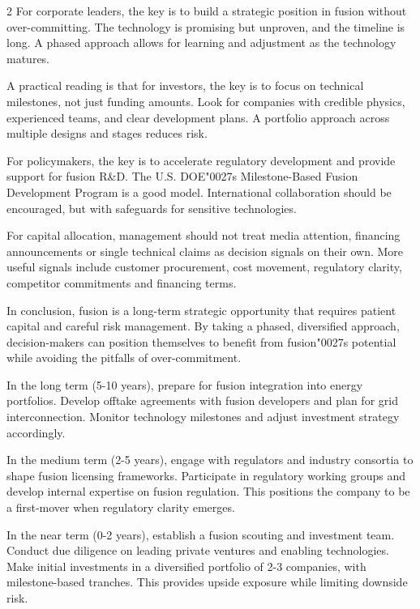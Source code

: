 \documentclass[10pt,a4paper]{article}
\newcommand{\BOApos}{{\BOQuoteFont\char"0027}}
\begin{document}
\begin{multicols}{2}
{\small For corporate leaders, the key is to build a strategic position in fusion without over-committing. The technology is promising but unproven, and the timeline is long. A phased approach allows for learning and adjustment as the technology matures.}\par
{\small A practical reading is that for investors, the key is to focus on technical milestones, not just funding amounts. Look for companies with credible physics, experienced teams, and clear development plans. A portfolio approach across multiple designs and stages reduces risk.}\par
{\small For policymakers, the key is to accelerate regulatory development and provide support for fusion R\&D. The U.S. DOE\BOApos{}s Milestone-Based Fusion Development Program is a good model. International collaboration should be encouraged, but with safeguards for sensitive technologies.}\par
{\small For capital allocation, management should not treat media attention, financing announcements or single technical claims as decision signals on their own. More useful signals include customer procurement, cost movement, regulatory clarity, competitor commitments and financing terms.}\par
{\small In conclusion, fusion is a long-term strategic opportunity that requires patient capital and careful risk management. By taking a phased, diversified approach, decision-makers can position themselves to benefit from fusion\BOApos{}s potential while avoiding the pitfalls of over-commitment.}\par
{\small In the long term (5-10 years), prepare for fusion integration into energy portfolios. Develop offtake agreements with fusion developers and plan for grid interconnection. Monitor technology milestones and adjust investment strategy accordingly.}\par
{\small In the medium term (2-5 years), engage with regulators and industry consortia to shape fusion licensing frameworks. Participate in regulatory working groups and develop internal expertise on fusion regulation. This positions the company to be a first-mover when regulatory clarity emerges.}\par
{\small In the near term (0-2 years), establish a fusion scouting and investment team. Conduct due diligence on leading private ventures and enabling technologies. Make initial investments in a diversified portfolio of 2-3 companies, with milestone-based tranches. This provides upside exposure while limiting downside risk.}\par
\end{multicols}
\end{document}
